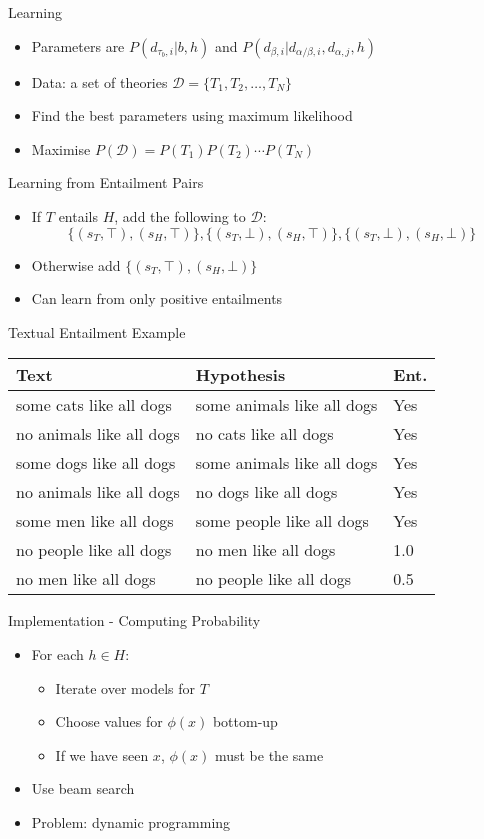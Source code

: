 \documentclass{beamer}
\newlength{\wideitemsep}
\let\olditem\item
\renewcommand{\item}{\setlength{\itemsep}{\wideitemsep}\olditem}
\begin{document}
\begin{frame}{Learning}
  \begin{itemize}
  \item Parameters are $P(d_{\tau_b,i}|b, h)$ and $P(d_{\beta,i}|d_{\alpha/\beta,i}, d_{\alpha,j},h)$
  \item Data: a set of theories $\mathcal{D} = \{T_1, T_2, \ldots, T_N\}$
  \item Find the best parameters using maximum likelihood
  \item Maximise $P(\mathcal{D}) = P(T_1)P(T_2)\cdots P(T_N)$
  \end{itemize}
\end{frame}

\begin{frame}{Learning from Entailment Pairs}
  \begin{itemize}
    \item If $T$ entails $H$, add the following to $\mathcal{D}$:
      $$\{(s_T,\top),(s_H,\top)\}, \{(s_T,\bot),(s_H,\top)\},\{(s_T,\bot),(s_H,\bot)\}$$
    \item Otherwise add $\{(s_T,\top),(s_H,\bot)\}$
    \item Can learn from only positive entailments
  \end{itemize}
\end{frame}

\begin{frame}{Textual Entailment Example}
\begin{tabular}{|l|l|l|}
\hline
Text & Hypothesis & Ent.\\
\hline
some cats like all dogs & some animals like all dogs & Yes\\
no animals like all dogs & no cats like all dogs & Yes\\
some dogs like all dogs & some animals like all dogs & Yes\\
no animals like all dogs & no dogs like all dogs & Yes\\
some men like all dogs & some people like all dogs & Yes\\
\hline
no people like all dogs & no men like all dogs & 1.0\\
no men like all dogs & no people like all dogs & 0.5\\
\hline
\end{tabular}
\end{frame}

\begin{frame}{Implementation - Computing Probability}
  \begin{itemize}
  \item For each $h\in H$:
    \begin{itemize}
    \item Iterate over models for $T$
    \item Choose values for $\phi(x)$ bottom-up
    \item If we have seen $x$, $\phi(x)$ must be the same
    \end{itemize}
  \item Use beam search
  \item Problem: dynamic programming
  \end{itemize}
\end{frame}
\end{document}
